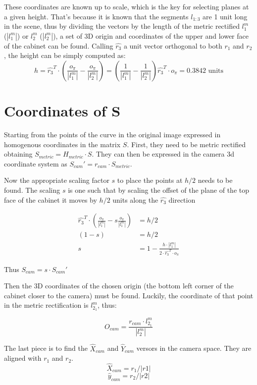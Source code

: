 These coordinates are known up to scale, which is the key for selecting planes at a given height. That's because it is known that the segments $l_{1:3}$ are 1 unit long in the scene, thus by dividing the vectors by the length of the metric rectified  $l_1^m$ ($|l_1^m|$) or $l_2^m$ ($|l_2^m|$), a set of 3D origin and coordinates of the upper and lower face of the cabinet can be found. Calling $\hat{r_3}$ a unit vector orthogonal to both $r_1$ and $r_2$, the height can be simply computed as:
$$
h = \hat{r_3}^T \cdot (\frac{o_\pi}{|l_1^m|} - \frac{o_\pi}{|l_2^m|}) = (\frac{1}{|l_1^m|} - \frac{1}{|l_2^m|}) \hat{r_3}^T \cdot o_\pi = 0.3842 \text{ units}
$$

\section{Coordinates of S}
Starting from the points of the curve in the original image expressed in homogenous coordinates in the matrix $S$. First, they need to be metric rectified obtaining $S_{metric} = H_{metric}\cdot S$. They can then be expressed in the camera 3d coordinate system as $S_{cam}' = r_{cam} \cdot S_{metric}$.

Now the appropriate scaling factor $s$ to place the points at $h/2$ needs to be found. The scaling $s$ is one such that by scaling the offset of the plane of the top face of the cabinet it moves by $h/2$ units along the $\hat{r_3}$ direction

\begin{equation*}
\begin{split}
\hat{r_3}^T \cdot(\frac{o_\pi}{|l_1^m|} - s \frac{o_\pi}{|l_1^m|}) &= h/2\\
(1 - s) &= h/2\\
s &= 1 - \frac{h\cdot |l_1^m|}{2\cdot \hat{r_3}^T \cdot o_\pi}
\end{split}
\end{equation*}

Thus $S_{cam} = s \cdot S_{cam}'$

Then the 3D coordinates of the chosen origin (the bottom left corner of the cabinet closer to the camera) must be found. Luckily, the coordinate of that point in the metric rectification is $l_{2_1}^m$, thus:

$$
O_{cam} = \frac{r_{cam} \cdot l_{2_1}^m}{|l_2^m|}
$$

The last piece is to find the $\hat{X}_{cam}$ and $\hat{Y}_{cam}$ versors in the camera space. They are aligned with $r_1$ and $r_2$.
$$
\hat{X}_{cam} = r_1 / |r1|
$$
$$
\hat{y}_{cam} = r_2 / |r2|
$$

